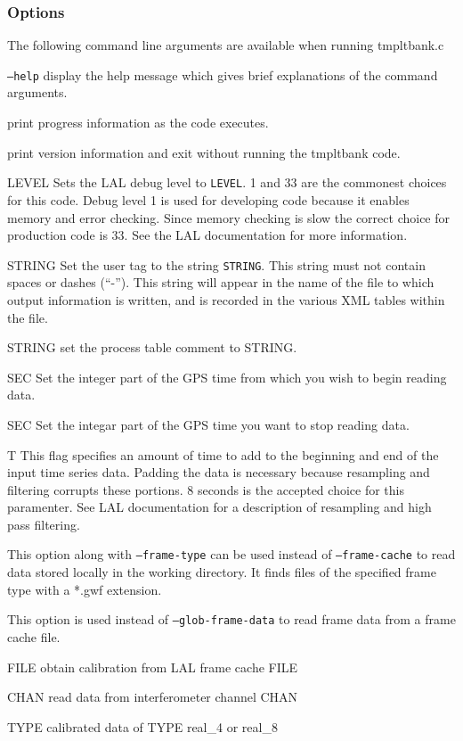 \subsubsection{Options}
\noindent The following command line arguments are available when running tmpltbank.c
\\
\begin{entry}
\item[\texttt{--help}] display the help message which gives brief explanations
of the command arguments.  
\item[\option{--verbose}] print progress information as the code executes.
\item[\option{--version}] print version information and exit without running 
the tmpltbank code. 
\item[\option{--debug-level} \textsc{LEVEL}] Sets the LAL debug level to \texttt{LEVEL}.  
1 and 33 are the commonest choices for this code.  Debug level 1 is used for 
developing code because it enables memory and error checking.  Since memory 
checking is slow the correct choice for production code is 33.  
See the LAL documentation for more information.  
\item[\option{--user-tag} \textsc{STRING}] Set the user tag to the string \texttt{STRING}.  
This string must not contain spaces or dashes (``-'').  This string will appear 
in the name of the file to which output information is written, and is recorded 
in the various XML tables within the file.
\item[\option{--comment} \textsc{STRING}] set the process table comment to STRING.
\item[\option{--gps-start-time} \textsc{SEC}] Set the integer part of the GPS time from 
which you wish to begin reading data.
\item[\option{--gps-end-time} \textsc{SEC}] Set the integar part of the GPS time you want
to stop reading data. 
\item[\option{--pad-data} \textsc{T}] This flag specifies an amount of time to add to 
the beginning and end of the input time series data.  Padding the data is 
necessary because resampling and filtering corrupts these portions. 
8 seconds is the accepted choice for this paramenter.  See LAL documentation 
for a description of resampling and high pass filtering.  
\item[\option{--glob-frame-data}] This option along with \texttt{--frame-type}
can be used instead of \texttt{--frame-cache} to read data stored locally in 
the working directory.  It finds files of the specified frame type with a *.gwf 
extension. 
\item[\option{--frame-cache}] This option is used instead of 
\texttt{--glob-frame-data} to read frame data from a frame cache file. 
\item[\option{--calibration-cache} \textsc{FILE}] obtain calibration from LAL frame 
cache FILE
\item[\option{--channel-name} \textsc{CHAN}] read data from interferometer channel CHAN
\item[\option{--calibrated-data} \textsc{TYPE}] calibrated data of TYPE real\_4 or real\_8


\end{entry}

